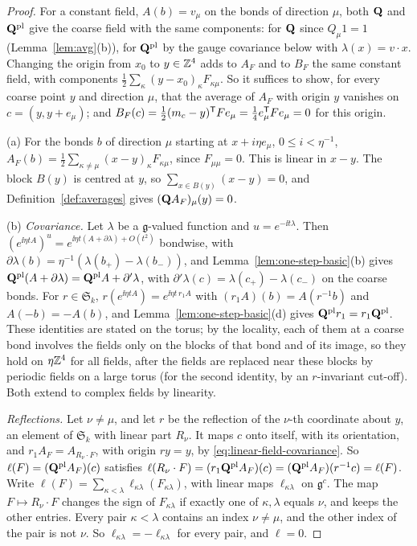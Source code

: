 \begin{proof}
For a constant field, $A(b)=v_\mu$ on the bonds of direction $\mu$, both $\mathbf Q$ and $\mathbf Q^{\rm pl}$ give the coarse field with the same components: for $\mathbf Q$ since $Q_\mu1=1$ (Lemma~\ref{lem:avg}(b)), for $\mathbf Q^{\rm pl}$ by the gauge covariance below with $\lambda(x)=v\cdot x$. Changing the origin from $x_0$ to $y\in\mathbb Z^4$ adds to $A_F$ and to $B_F$ the same constant field, with components $\frac12\sum_\kappa(y-x_0)_\kappa F_{\kappa\mu}$. So it suffices to show, for every coarse point $y$ and direction $\mu$, that the average of $A_F$ with origin $y$ vanishes on $c=(y,y+e_\mu)$; and $B_F(c)=\frac12(m_c-y)^{\sf T}Fe_\mu=\frac14e_\mu^{\sf T}Fe_\mu=0$ for this origin.

(a) For the bonds $b$ of direction $\mu$ starting at $x+i\eta e_\mu$, $0\le i<\eta^{-1}$, $A_F(b)=\frac12\sum_{\kappa\ne\mu}(x-y)_\kappa F_{\kappa\mu}$, since $F_{\mu\mu}=0$. This is linear in $x-y$. The block $B(y)$ is centred at $y$, so $\sum_{x\in B(y)}(x-y)=0$, and Definition~\ref{def:averages} gives $(\mathbf Q A_F)_\mu(y)=0$.

(b) \emph{Covariance.} Let $\lambda$ be a $\mathfrak g$-valued function and $u=e^{-\ii t\lambda}$. Then $(e^{\ii\eta tA})^u=e^{\ii\eta t(A+\partial\lambda)+O(t^2)}$ bondwise, with $\partial\lambda(b)=\eta^{-1}(\lambda(b_+)-\lambda(b_-))$, and Lemma~\ref{lem:one-step-basic}(b) gives $\mathbf Q^{\rm pl}(A+\partial\lambda)=\mathbf Q^{\rm pl}A+\partial'\lambda$, with $\partial'\lambda(c)=\lambda(c_+)-\lambda(c_-)$ on the coarse bonds. For $r\in\mathfrak S_k$, $r(e^{\ii\eta tA})=e^{\ii\eta t\,r_1A}$ with $(r_1A)(b)=A(r^{-1}b)$ and $A(-b)=-A(b)$, and Lemma~\ref{lem:one-step-basic}(d) gives $\mathbf Q^{\rm pl}r_1=r_1\mathbf Q^{\rm pl}$. These identities are stated on the torus; by the locality, each of them at a coarse bond involves the fields only on the blocks of that bond and of its image, so they hold on $\eta\mathbb Z^4$ for all fields, after the fields are replaced near these blocks by periodic fields on a large torus (for the second identity, by an $r$-invariant cut-off). Both extend to complex fields by linearity.

\emph{Reflections.} Let $\nu\ne\mu$, and let $r$ be the reflection of the $\nu$-th coordinate about $y$, an element of $\mathfrak S_k$ with linear part $R_\nu$. It maps $c$ onto itself, with its orientation, and $r_1A_F=A_{R_\nu\cdot F}$, with origin $ry=y$, by \eqref{eq:linear-field-covariance}. So $\ell(F)=(\mathbf Q^{\rm pl}A_F)(c)$ satisfies $\ell(R_\nu\cdot F)=(r_1\mathbf Q^{\rm pl}A_F)(c)=(\mathbf Q^{\rm pl}A_F)(r^{-1}c)=\ell(F)$. Write $\ell(F)=\sum_{\kappa<\lambda}\ell_{\kappa\lambda}(F_{\kappa\lambda})$, with linear maps $\ell_{\kappa\lambda}$ on $\mathfrak g^c$. The map $F\mapsto R_\nu\cdot F$ changes the sign of $F_{\kappa\lambda}$ if exactly one of $\kappa,\lambda$ equals $\nu$, and keeps the other entries. Every pair $\kappa<\lambda$ contains an index $\nu\ne\mu$, and the other index of the pair is not $\nu$. So $\ell_{\kappa\lambda}=-\ell_{\kappa\lambda}$ for every pair, and $\ell=0$.
\end{proof}

